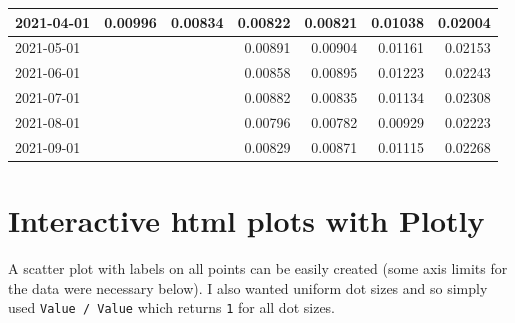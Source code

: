 \documentclass[
]{book}
\begin{document}
\begin{table}
\begin{tabular}[t]{l|r|r|r|r|r|r}
\hline
2021-04-01 & 0.00996 & 0.00834 & 0.00822 & 0.00821 & 0.01038 & 0.02004\\
\hline
2021-05-01 &  &  & 0.00891 & 0.00904 & 0.01161 & 0.02153\\
\hline
2021-06-01 &  &  & 0.00858 & 0.00895 & 0.01223 & 0.02243\\
\hline
2021-07-01 &  &  & 0.00882 & 0.00835 & 0.01134 & 0.02308\\
\hline
2021-08-01 &  &  & 0.00796 & 0.00782 & 0.00929 & 0.02223\\
\hline
2021-09-01 &  &  & 0.00829 & 0.00871 & 0.01115 & 0.02268\\
\hline
\end{tabular}
\end{table}

\hypertarget{interactive-html-plots-with-plotly}{%
\section{Interactive html plots with Plotly}\label{interactive-html-plots-with-plotly}}

A scatter plot with labels on all points can be easily created (some axis limits for the data were necessary below). I also wanted uniform dot sizes and so simply used \texttt{Value\ /\ Value} which returns \texttt{1} for all dot sizes.
\end{document}
